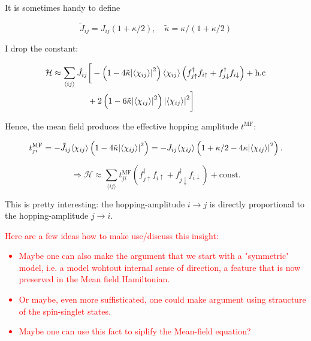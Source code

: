 \documentclass{article}
\begin{document}
It is sometimes handy to define 

\begin{equation}
	\tilde{J}_{ij} = J_{ij}\left( 1+ \kappa/2\right), \quad \tilde{\kappa} = \kappa/(1+\kappa/2)
\end{equation}

I drop the constant:

\begin{align}
	\begin{split}
		\mathcal{H} \approx \sum_{\langle ij \rangle} \tilde{J}_{ij}&\bigg[ -\left(1 - 4 \tilde{\kappa} \abs{\langle \chi_{ij}\rangle}^2\right)\langle \chi_{ij} \rangle \left(f_{j\uparrow}^\dagger f_{i\uparrow} + f_{j\downarrow}^\dagger f_{i\downarrow}\right) + \text{h.c} \\
		&+ 2\left( 1 - 6\tilde{\kappa} \abs{\langle \chi_{ij} \rangle}^2 \right) \abs{\langle \chi_{ij} \rangle}^2 \bigg] 
	\end{split}
\end{align}

Hence, the mean field produces the effective hopping amplitude $t^{\text{MF}}$:

\begin{equation}
	t^{\text{MF}}_{ji} = - \tilde{J}_{ij}\langle \chi_{ij} \rangle \left(1 - 4\tilde{\kappa} \abs{ \langle \chi_{ij} \rangle}^2\right) =  -J_{ij}\langle \chi_{ij} \rangle \left(1 + \kappa/2  - 4 \kappa \abs{\langle \chi_{ij} \rangle}^2 \right).
\end{equation}

\begin{equation}
	\Rightarrow \mathcal{H} \approx \sum_{\langle ij \rangle} t^{\text{MF}}_{ji}\left( f_{j\uparrow}^\dagger f_{i\uparrow} + f_{j\downarrow}^\dagger f_{i\downarrow} \right) + \text{const.}
\end{equation}

This is pretty interesting: the hopping-amplitude $i \rightarrow j$ is directly proportional to the hopping-amplitude $j \rightarrow i$. \textcolor{red}{Here are a few ideas how to make use/discuss this insight:
\begin{itemize}
	\item Maybe one can also make the argument that we start with a "symmetric" model, i.e. a model wohtout internal sense of direction, a feature that is now preserved in the Mean field Hamiltonian. 
	\item Or maybe, even more suffisticated, one could make argument using straucture of the spin-singlet states.
	\item Maybe one can use this fact to siplify the Mean-field equation?
\end{itemize}}
\end{document}
